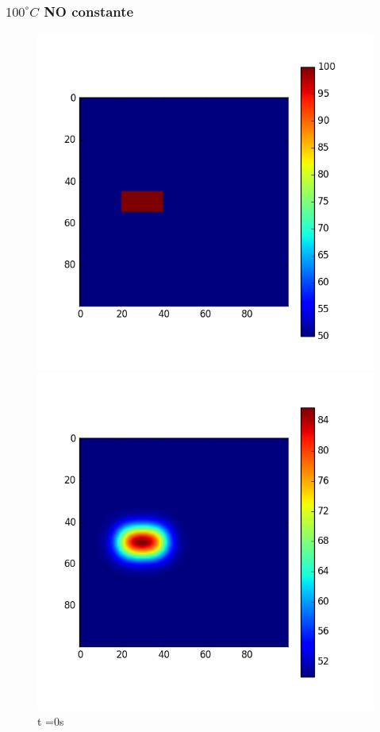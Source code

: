 \documentclass{article}
\begin{document}
\subsubsection{$100^\circ C$ NO constante}
\begin{figure}[H]
  \includegraphics[width=\linewidth]{fijasNOCte0.png}
  \caption{t =0s}\label{fig:awesome_image1}
\endminipage\hfill
{}
  \includegraphics[width=\linewidth]{fijasNOCte100.png}

\end{figure}
\end{document}
